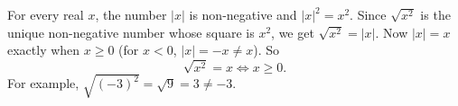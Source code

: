 For every real $x$, the number $|x|$ is non-negative and $|x|^2=x^2$. Since $\sqrt{x^2}$ is the unique non-negative number whose square is $x^2$, we get $\sqrt{x^2}=|x|$. Now $|x|=x$ exactly when $x\ge0$ (for $x<0$, $|x|=-x\ne x$). So
\[\sqrt{x^2}=x\iff\boxed{x\ge0}.\]
For example, $\sqrt{(-3)^2}=\sqrt9=3\ne-3$.
